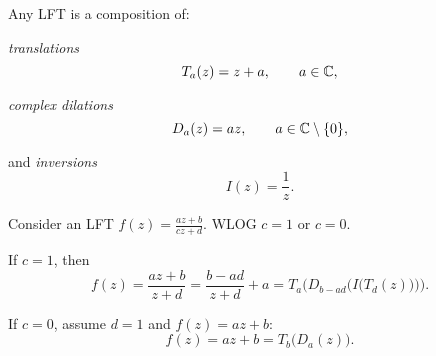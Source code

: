 \documentclass[10pt,aspectratio=169]{beamer}
\begin{document}
\begin{frame}
Any LFT is a composition of:

\medskip
\pause

\emph{translations}
\begin{equation*}
T_a(z) = z + a , \qquad a \in {\mathbb{C}},
\end{equation*}

\medskip
\pause

\emph{complex dilations}
\begin{equation*}
D_a(z) = az , \qquad a \in {\mathbb{C}} \setminus \{ 0 \} ,
\end{equation*}

\medskip
\pause

and \emph{inversions}
\begin{equation*}
I(z) = \frac{1}{z}.
\end{equation*}

\medskip
\pause

Consider an LFT $f(z) = \frac{az+b}{cz+d}$.  WLOG $c=1$ or $c=0$.

\medskip
\pause

If $c=1$, then
\begin{equation*}
f(z)
=
\frac{a z + b}{z + d}
=
\frac{b-ad}{z+d}+a
=
T_a\biggr(D_{b-ad}\Bigr(I\bigl(T_d(z)\bigr)\Bigr)\biggr) .
\end{equation*}

\pause

If $c=0$, assume $d=1$ and $f(z) = az + b$:
\begin{equation*}
f(z) = az+b = T_b\bigl(D_a(z)\bigr) .
\end{equation*}
\end{frame}
\end{document}
